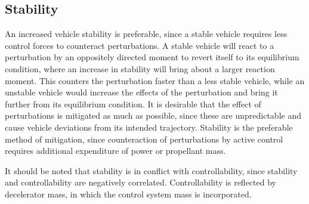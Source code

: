 \subsection{Stability}
An increased vehicle stability is preferable, since a stable vehicle requires less control forces to counteract perturbations. A stable vehicle will react to a perturbation by an oppositely directed moment to revert itself to its equilibrium condition, where an increase in stability will bring about a larger reaction moment. This counters the perturbation faster than a less stable vehicle, while an unstable vehicle would increase the effects of the perturbation and bring it further from its equilibrium condition. It is desirable that the effect of perturbations is mitigated as much as possible, since these are unpredictable and cause vehicle deviations from its intended trajectory. Stability is the preferable method of mitigation, since counteraction of perturbations by active control requires additional expenditure of power or propellant mass. 

It should be noted that stability is in conflict with controllability, since stability and controllability are negatively correlated. Controllability is reflected by decelerator mass, in which the control system mass is incorporated.




